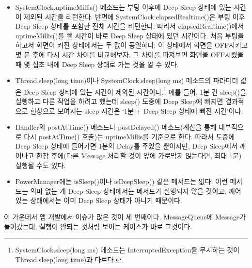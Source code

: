 \begin{itemize}
\item SystemClock.uptimeMillis() 메소드는 부팅 이후에 Deep Sleep 상태에 있는 시간이 제외된 시간을 리턴한다. 반면에 SystemClock.elapsedRealtime()은 부팅 이후 Deep Sleep 상태를 포함한 전체 시간을 리턴한다. 
따라서 elapsedRealtime()에서 uptimeMillis()를 뺀 시간이 바로 Deep Sleep 상태에 있던 시간이다. 
처음 부팅을 하고서 화면이 켜진 상태에서는 두 값이 동일하다. 이 상태에서 화면을 OFF시키고 몇 분 후에 다시 시간 차이를 비교해보자. 그 차이를 따져보면 화면을 OFF시켰을 때 몇 십초 내에 Deep Sleep 상태로 가는 것을 알 수 있다.

\item Thread.sleep(long time)이나 SystemClock.sleep(long ms) 메소드의 파라미터 값은 Deep Sleep 상태에 있는 시간이 제외된 시간이다.\footnote{SystemClock.sleep(long ms) 메소드는 InterruptedException을 무시하는 것이 Thread.sleep(long time)과 다르다.} 예를 들어, 1분 간 sleep()을 실행하고 다른 작업을 하려고 했는데 sleep() 도중에 Deep Sleep에 빠지면 결과적으로 현상으로 보여지는 sleep 시간은 `1분 + Deep Sleep 상태에 빠진 시간'이다. 

\item Handler의 postAtTime() 메소드나 postDelayed() 메소드(계산을 통해 내부적으로 다시 postAtTime() 호출)는 uptimeMillis를 기준으로 한다. 따라서 도중에 Deep Sleep 상태에 들어가면 1분의 Delay를 주었을 뿐이지만, Deep Sleep에서 깨어나고 한참 후에(다른 Message 처리할 것이 앞에 가로막지 않는다면, 최대 1분) 실행될 수도 있다.
\item PowerManager에는 isSleep()이나 isDeepSleep() 같은 메서드는 없다. 이런 메서드는 의미 없는 게 Deep Sleep 상태에서는 메서드가 실행되지 않을 것이고, 깨어 있는 상태에서는 이미 Deep Sleep 상태가 아니기 때문이다.
\end{itemize}

이 가운데서 앱 개발에서 이슈가 많은 것이 세 번째이다. 
MessageQueue에 Message가 들어갔는데, 실행이 안되는 것처럼 보이는 케이스가 바로 그것이다.\\

